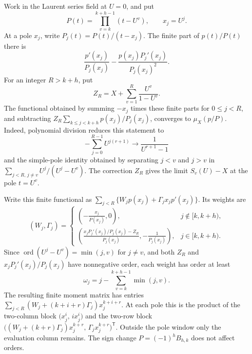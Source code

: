 \documentclass[12pt]{article}
\theoremstyle{remark}
\DeclareMathOperator{\ord}{ord}
\begin{document}
Work in the Laurent series field at $U=0$, and put
\[
P(t)=\prod_{v=k}^{k+h-1}(t-U^v),\qquad x_j=U^j.
\]
At a pole $x_j$, write $P_j(t)=P(t)/(t-x_j)$. The finite part of $p(t)/P(t)$ there is
\[
\frac{p'(x_j)}{P_j(x_j)}-
\frac{p(x_j)P_j'(x_j)}{P_j(x_j)^2}.
\]
For an integer $R>k+h$, put
\[
Z_R=X+\sum_{v=1}^{R}\frac{U^v}{1-U^v}.
\]
The functional obtained by summing $-x_j$ times these finite parts for $0\leq j<R$, and subtracting
$Z_R\sum_{k\leq j<k+h}p(x_j)/P_j(x_j)$, converges to
$\mu_X(p/P)$. Indeed, polynomial division reduces this statement to
\[
-\sum_{j=0}^{R-1}U^{j(r+1)}\longrightarrow\frac1{U^{r+1}-1}
\]
and the simple-pole identity obtained by separating $j<v$ and $j>v$ in
$\sum_{j<R,\,j\ne v}U^j/(U^j-U^v)$. The correction $Z_R$ gives the limit
$S_v(U)-X$ at the pole $t=U^v$.

Write this finite functional as
$\sum_{j<R}\{W_jp(x_j)+\Gamma_jx_jp'(x_j)\}$. Its weights are
\[
(W_j,\Gamma_j)=
\begin{cases}
\displaystyle\left(-\frac{x_j}{P(x_j)},0\right),&j\notin[k,k+h),\\[1.2ex]
\displaystyle\left(\frac{x_jP_j'(x_j)/P_j(x_j)-Z_R}{P_j(x_j)},
-\frac1{P_j(x_j)}\right),&j\in[k,k+h).
\end{cases}
\]
Since $\ord(U^j-U^v)=\min(j,v)$ for $j\ne v$, and both $Z_R$ and
$x_jP_j'(x_j)/P_j(x_j)$ have nonnegative order, each weight has order at least
\[
\omega_j=j-\sum_{v=k}^{k+h-1}\min(j,v).
\]
The resulting finite moment matrix has entries
$\sum_{j<R}(W_j+(k+i+r)\Gamma_j)x_j^{k+i+r}$. At each pole this is the product of the two-column block
$\bigl(x_j^i,\,i x_j^i\bigr)$ and the two-row block
$\bigl((W_j+(k+r)\Gamma_j)x_j^{k+r},\,\Gamma_jx_j^{k+r}\bigr)^{\mathsf T}$.
Outside the pole window only the evaluation column remains. The sign change
$P=(-1)^hB_{h,k}$ does not affect orders.
\end{document}
